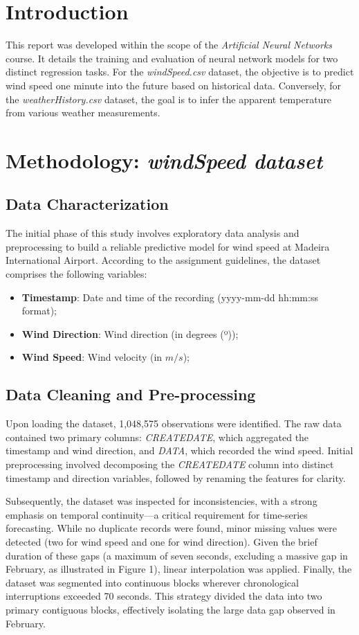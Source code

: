 \documentclass[conference]{IEEEtran}
\begin{document}
\section{Introduction}
This report was developed within the scope of the \textit{Artificial Neural Networks} course. It details the training and evaluation of neural network models for two distinct regression tasks. For the \textit{windSpeed.csv} dataset, the objective is to predict wind speed one minute into the future based on historical data. Conversely, for the \textit{weatherHistory.csv} dataset, the goal is to infer the apparent temperature from various weather measurements.

\section{Methodology: \textit{windSpeed dataset}}
\subsection{Data Characterization}
The initial phase of this study involves exploratory data analysis and preprocessing to build a reliable predictive model for wind speed at Madeira International Airport. According to the assignment guidelines, the dataset comprises the following variables:
\begin{itemize}
    \item \textbf{Timestamp}: Date and time of the recording (yyyy-mm-dd hh:mm:ss format);
    \item \textbf{Wind Direction}: Wind direction (in degrees (º));
    \item \textbf{Wind Speed}: Wind velocity (in $m/s$);
\end{itemize}

\subsection{Data Cleaning and Pre-processing}
Upon loading the dataset, 1,048,575 observations were identified. The raw data contained two primary columns: \textit{CREATEDATE}, which aggregated the timestamp and wind direction, and \textit{DATA}, which recorded the wind speed. Initial preprocessing involved decomposing the \textit{CREATEDATE} column into distinct timestamp and direction variables, followed by renaming the features for clarity.

Subsequently, the dataset was inspected for inconsistencies, with a strong emphasis on temporal continuity—a critical requirement for time-series forecasting. While no duplicate records were found, minor missing values were detected (two for wind speed and one for wind direction). Given the brief duration of these gaps (a maximum of seven seconds, excluding a massive gap in February, as illustrated in Figure 1), linear interpolation was applied. Finally, the dataset was segmented into continuous blocks wherever chronological interruptions exceeded 70 seconds. This strategy divided the data into two primary contiguous blocks, effectively isolating the large data gap observed in February.
\end{document}
